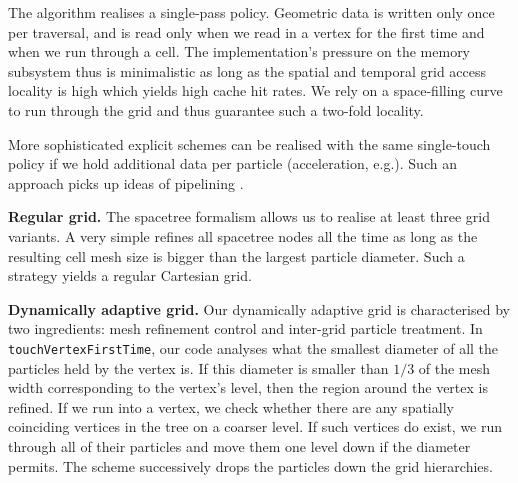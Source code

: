 \documentclass[times,12pt]{article}
\begin{document}
The algorithm realises a single-pass policy. Geometric data is written only once
per traversal, and is read only when we read in a vertex for the first time and
when we run through a cell.
The implementation's pressure on the memory subsystem thus is minimalistic as
long as the spatial and temporal grid access locality \cite{dime} is high which
yields high cache hit rates.
We rely on a space-filling curve to
run through the grid \cite{Weinzierl:2009:Diss,Weinzierl:11:Peano} and thus
guarantee such a two-fold locality.


\noindent
More sophisticated explicit schemes can be realised with the same single-touch
policy if we hold additional data per particle (acceleration, e.g.).
Such an approach picks up ideas of pipelining \cite{Plimpton1995}.


{\bf Regular grid.}
The spacetree formalism allows us to realise at least three grid variants. 
A very simple refines all spacetree nodes all the time as long as the resulting
cell mesh size is bigger than the largest particle diameter.
Such a strategy yields a regular Cartesian grid. 

{\bf Dynamically adaptive grid.}
Our dynamically adaptive grid is characterised by two ingredients: mesh
refinement control and inter-grid particle treatment.
In \texttt{touchVertexFirstTime}, our code analyses what the smallest diameter
of all the particles held by the vertex is.
If this diameter is smaller than $1/3$ of the mesh width corresponding to the
vertex's level, then the region around the vertex is refined.
If we run into a vertex, we check whether there are any spatially coinciding
vertices in the tree on a coarser level.
If such vertices do exist, we run through all of their particles and move them
one level down if the diameter permits.
The scheme successively drops the particles down the grid hierarchies.
\end{document}
